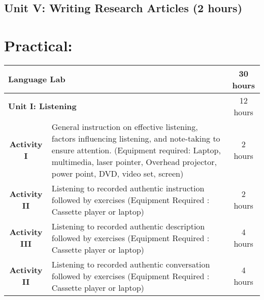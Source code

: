 \subsection*{Unit V: Writing Research Articles \hfill (2 hours)}

\section*{Practical:}
\begin{table}[h]
    \centering
    \begin{tabular}{|c|m{30em}|c|}
    \hline
        \multicolumn{2}{|l|}{\textbf{Language Lab}} & 30 hours  \\
    \hline
        \multicolumn{2}{|l|}{\textbf{Unit I: Listening}} & 12 hours \\
    \hline
        \textbf{Activity I} & General instruction on effective listening, factors influencing listening, and note-taking to ensure attention. (Equipment required: Laptop, multimedia, laser pointer, Overhead projector, power point, DVD, video set, screen) & 2 hours \\
    \hline
     \textbf{Activity II} & Listening to recorded authentic instruction followed by exercises  (Equipment Required : Cassette player or laptop) & 2 hours \\
    \hline
     \textbf{Activity III} & Listening to recorded authentic description followed by exercises  (Equipment Required : Cassette player or laptop) & 4 hours \\
    \hline
     \textbf{Activity II} & Listening to recorded authentic conversation followed by exercises  (Equipment Required : Cassette player or laptop) & 4 hours \\
    

\end{tabular}
\end{table}
